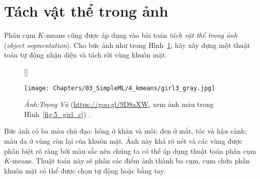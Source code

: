 \section{Tách vật thể trong ảnh}


Phân cụm $K$-means cũng được áp dụng vào bài toán \textit{tách vật thể trong ảnh} (\textit{object segmentation}). Cho bức ảnh như trong Hình~\ref{fig:5_girl}, hãy xây dựng một thuật toán tự động nhận diện và tách rời vùng khuôn mặt.

\begin{figure}[t]
[\FBwidth]
{\caption{
\textit{Ảnh:Trọng Vũ} (\url{https://goo.gl/9D8aXW}, xem ảnh màu trong Hình~\ref{fig:5_girl_c}) .
}
\label{fig:5_girl}}
{ %
\texttt{[image: Chapters/03\_SimpleML/4\_kmeans/girl3\_gray.jpg]}
}
\end{figure}






Bức ảnh có ba màu chủ đạo: hồng ở khăn và môi; đen ở mắt, tóc và hậu cảnh; màu
da ở vùng còn lại của khuôn mặt. Ảnh này khá rõ nét và các vùng được phân biệt
rõ ràng bởi màu sắc nên chúng ta có thể áp dụng thuật toán phân cụm $K$-means.
Thuật toán này sẽ phân các điểm ảnh thành ba cụm, cụm chứa phần khuôn mặt có thể được chọn tự động hoặc bằng tay.

